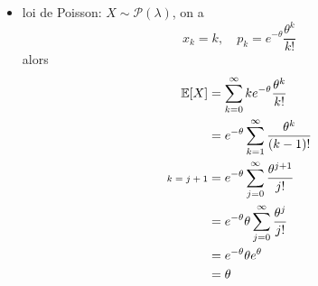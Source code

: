 {\begin{td-sol}[]
\begin{enumerate}
\begin{itemize}
                \item loi de Poisson: \(X \sim \mathcal P(\lambda)\),
                on a
                \begin{equation*}
                    x_k = k, \quad p_k = e^{-\theta} \frac{\theta^k}{k!}
                \end{equation*}
                alors
                \begin{equation*}
                    \begin{aligned}
                        \mathbb{E}\mathopen{}\left[X\right]\mathclose{} 
                        &= \sum_{k=0}^\infty k e^{-\theta} \frac{\theta^k}{k!}\\
                        &= e^{-\theta} \sum_{k=1}^\infty \frac{\theta^k}{(k-1)!}\\
                        \text{\scriptsize{\(k=j+1\)}}&= e^{-\theta} \sum_{j=0}^\infty \frac{\theta^{j+1}}{j!}\\
                        &= e^{-\theta} \theta \sum_{j=0}^\infty \frac{\theta^j}{j!}\\
                        &= e^{-\theta} \theta e^\theta\\
                        &= \theta
                    \end{aligned}
                \end{equation*}
            \end{itemize}
        \end{enumerate}
    \end{td-sol}
}{}

